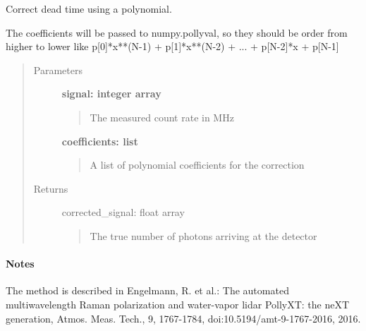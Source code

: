 \documentclass[letterpaper,10pt,english]{sphinxmanual}
\begin{document}
\begin{fulllineitems}
\label{pre_processing:pre_processing.correct_dead_time_polynomial_count_rate}
Correct dead time using a polynomial.

The coefficients will be passed to numpy.pollyval, so they should be order from higher to lower like
p{[}0{]}*x**(N-1) + p{[}1{]}*x**(N-2) + ... + p{[}N-2{]}*x + p{[}N-1{]}
\begin{quote}\begin{description}
\item[{Parameters}] \leavevmode
\textbf{signal: integer array}
\begin{quote}

The measured count rate in MHz
\end{quote}

\textbf{coefficients: list}
\begin{quote}

A list of polynomial coefficients for the correction
\end{quote}

\item[{Returns}] \leavevmode
corrected\_signal: float array
\begin{quote}

The true number of photons arriving at the detector
\end{quote}

\end{description}\end{quote}
\paragraph{Notes}

The method is described in
Engelmann, R. et al.: The automated multiwavelength Raman polarization and water-vapor lidar PollyXT:
the neXT generation, Atmos. Meas. Tech., 9, 1767-1784, doi:10.5194/amt-9-1767-2016, 2016.

\end{fulllineitems}

\end{document}
